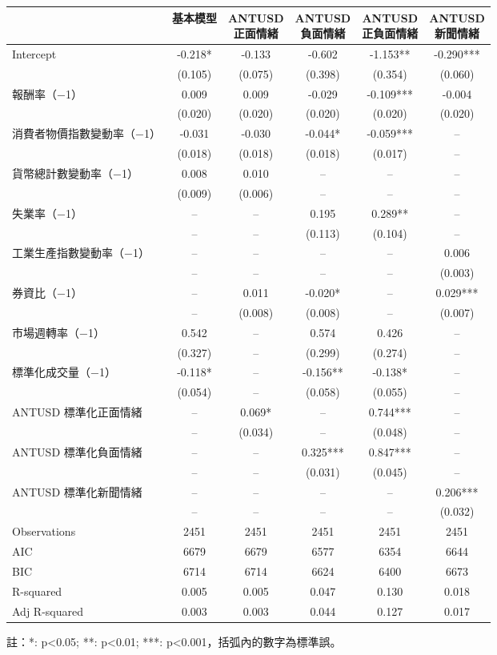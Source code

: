 \documentclass{article}
\begin{document}
    \fontsize{12pt}{14pt}\selectfont
    
    \begin{tabular}{lccccc}
\toprule
 & 基本模型 & \makecell{ANTUSD\\正面情緒} & \makecell{ANTUSD\\負面情緒} & \makecell{ANTUSD\\正負面情緒} & \makecell{ANTUSD\\新聞情緒} \\
\midrule
Intercept & -0.218* & -0.133 & -0.602 & -1.153** & -0.290*** \\
 & (0.105) & (0.075) & (0.398) & (0.354) & (0.060) \\
報酬率（−1） & 0.009 & 0.009 & -0.029 & -0.109*** & -0.004 \\
 & (0.020) & (0.020) & (0.020) & (0.020) & (0.020) \\
消費者物價指數變動率（−1） & -0.031 & -0.030 & -0.044* & -0.059*** & -- \\
 & (0.018) & (0.018) & (0.018) & (0.017) & -- \\
貨幣總計數變動率（−1） & 0.008 & 0.010 & -- & -- & -- \\
 & (0.009) & (0.006) & -- & -- & -- \\
失業率（−1） & -- & -- & 0.195 & 0.289** & -- \\
 & -- & -- & (0.113) & (0.104) & -- \\
工業生產指數變動率（−1） & -- & -- & -- & -- & 0.006 \\
 & -- & -- & -- & -- & (0.003) \\
券資比（−1） & -- & 0.011 & -0.020* & -- & 0.029*** \\
 & -- & (0.008) & (0.008) & -- & (0.007) \\
市場週轉率（−1） & 0.542 & -- & 0.574 & 0.426 & -- \\
 & (0.327) & -- & (0.299) & (0.274) & -- \\
標準化成交量（−1） & -0.118* & -- & -0.156** & -0.138* & -- \\
 & (0.054) & -- & (0.058) & (0.055) & -- \\
ANTUSD 標準化正面情緒 & -- & 0.069* & -- & 0.744*** & -- \\
 & -- & (0.034) & -- & (0.048) & -- \\
ANTUSD 標準化負面情緒 & -- & -- & 0.325*** & 0.847*** & -- \\
 & -- & -- & (0.031) & (0.045) & -- \\
ANTUSD 標準化新聞情緒 & -- & -- & -- & -- & 0.206*** \\
 & -- & -- & -- & -- & (0.032) \\
\midrule
Observations &   2451 &   2451 &   2451 &   2451 &   2451 \\
AIC &    6679 &    6679 &    6577 &    6354 &    6644 \\
BIC &    6714 &    6714 &    6624 &    6400 &    6673 \\
R-squared &    0.005 &    0.005 &    0.047 &    0.130 &    0.018 \\
Adj R-squared &    0.003 &    0.003 &    0.044 &    0.127 &    0.017 \\
\bottomrule
\end{tabular}

    
    \fontsize{11pt}{14pt}\selectfont
    註：*: p<0.05; **: p<0.01; ***: p<0.001，括弧內的數字為標準誤。
    
\end{document}
